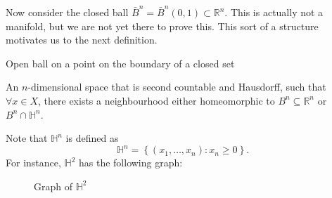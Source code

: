 \documentclass[notoc,notitlepage]{tufte-book}
\begin{document}
\begin{eg}
  Now consider the closed ball $\bar{B}^n = \bar{B}^n(0, 1) \subset \mathbb{R}^n$. This is
  actually not a manifold, but we are not yet there to prove this. This sort of a structure
  motivates us to the next definition.
  \begin{marginfigure}
    \centering
    \caption{Open ball on a point on the boundary of a closed set}\label{fig:open_ball_on_a_point_on_the_boundary_of_a_closed_set}
  \end{marginfigure}
\end{eg}

\begin{defn}\label{defn:manifold_on_a_boundary}
  An $n$-dimensional space that is second countable and Hausdorff, such that $\forall x \in X$,
  there exists a neighbourhood either homeomorphic to $B^n \subseteq \mathbb{R}^n$ or
  $B^n \cap \mathbb{H}^n$.
\end{defn}

\begin{note}
  Note that $\mathbb{H}^n$ is defined as
  \begin{equation*}
    \mathbb{H}^n = \left\{ ( x_1, \ldots, x_n ) : x_n \geq 0 \right\}.
  \end{equation*}
  For instance, $\mathbb{H}^2$ has the following graph:
  \begin{figure}[ht]
    \centering
    \caption{Graph of $\mathbb{H}^2$}
    \label{fig:graph_of_h_2}
  \end{figure}
\end{note}



%
\label{prt:introduction_to_topological_manifolds}



\appendix

\backmatter

\pagestyle{plain}

\nobibliography*


\printindex
\end{document}
